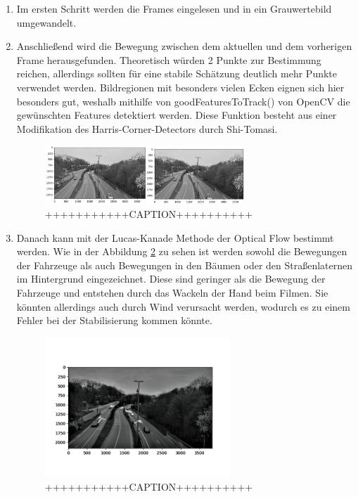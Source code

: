 \documentclass[conference]{IEEEtran}
\begin{document}
	\begin{enumerate}
		\item Im ersten Schritt werden die Frames eingelesen und in ein Grauwertebild umgewandelt.
		
		\item Anschließend wird die Bewegung zwischen dem aktuellen und dem vorherigen Frame herausgefunden. Theoretisch würden 2 Punkte zur Bestimmung reichen, allerdings sollten für eine stabile Schätzung deutlich mehr Punkte verwendet werden.
		Bildregionen mit besonders vielen Ecken eignen sich hier besonders gut, weshalb mithilfe von goodFeaturesToTrack() von OpenCV die gewünschten Features detektiert werden.
		Diese Funktion besteht aus einer Modifikation des Harris-Corner-Detectors durch Shi-Tomasi.
		
		\begin{figure}[!h]
			\begin{center}
				\includegraphics[width=7.5cm]{Media/VideoStab.png}
				\caption{+++++++++++CAPTION++++++++++}
				\label{VS1}
			\end{center}
		\end{figure}
		
		\item Danach kann mit der Lucas-Kanade Methode der Optical Flow bestimmt werden. Wie in der Abbildung \ref{VS2} zu sehen ist werden sowohl die Bewegungen der Fahrzeuge als auch Bewegungen in den Bäumen oder den Straßenlaternen im Hintergrund eingezeichnet. Diese sind geringer als die Bewegung der Fahrzeuge und entstehen durch das Wackeln der Hand beim Filmen. Sie könnten allerdings auch durch Wind verursacht werden, wodurch es zu einem Fehler bei der Stabilisierung kommen könnte.
		
		\begin{figure}[!h]
			\begin{center}
				\includegraphics[width=7cm]{Media/VideoStab2.png}
				\caption{+++++++++++CAPTION++++++++++}
				\label{VS2}
			\end{center}
		\end{figure}
		

\end{enumerate}
\end{document}
